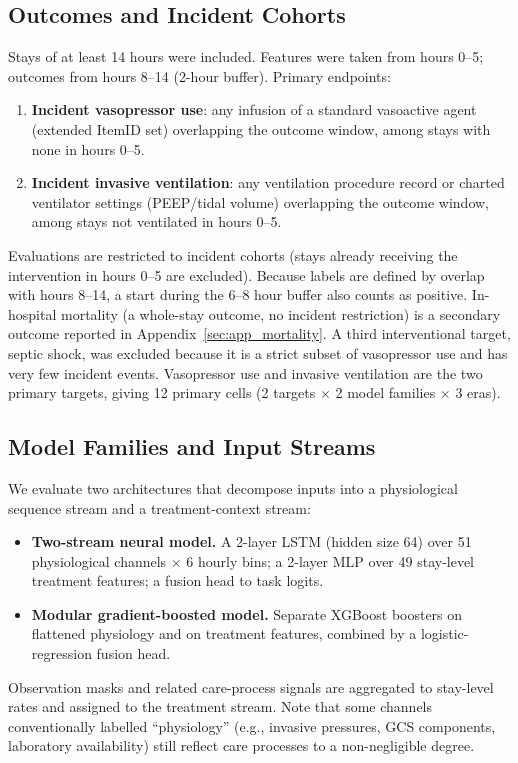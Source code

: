 \documentclass[10pt,a4paper,twocolumn]{article}
\begin{document}
	\subsection{Outcomes and Incident Cohorts}
	\label{sec:outcomes}
	Stays of at least 14 hours were included. Features were taken from hours 0--5; outcomes from hours 8--14 (2-hour buffer). Primary endpoints:
	\begin{enumerate}\setlength{\itemsep}{1pt}
		\item \textbf{Incident vasopressor use}: any infusion of a standard vasoactive agent (extended ItemID set) overlapping the outcome window, among stays with none in hours 0--5.
		\item \textbf{Incident invasive ventilation}: any ventilation procedure record or charted ventilator settings (PEEP/tidal volume) overlapping the outcome window, among stays not ventilated in hours 0--5.
	\end{enumerate}
	Evaluations are restricted to incident cohorts (stays already receiving the intervention in hours 0--5 are excluded). Because labels are defined by overlap with hours 8--14, a start during the 6--8 hour buffer also counts as positive. In-hospital mortality (a whole-stay outcome, no incident restriction) is a secondary outcome reported in Appendix~\ref{sec:app_mortality}. A third interventional target, septic shock, was excluded because it is a strict subset of vasopressor use and has very few incident events. Vasopressor use and invasive ventilation are the two primary targets, giving 12 primary cells (2 targets $\times$ 2 model families $\times$ 3 eras).
	
	\subsection{Model Families and Input Streams}
	We evaluate two architectures that decompose inputs into a physiological sequence stream and a treatment-context stream:
	\begin{itemize}\setlength{\itemsep}{1pt}
		\item \textbf{Two-stream neural model.} A 2-layer LSTM (hidden size 64) over 51 physiological channels $\times$ 6 hourly bins; a 2-layer MLP over 49 stay-level treatment features; a fusion head to task logits.
		\item \textbf{Modular gradient-boosted model.} Separate XGBoost boosters on flattened physiology and on treatment features, combined by a logistic-regression fusion head.
	\end{itemize}
	Observation masks and related care-process signals are aggregated to stay-level rates and assigned to the treatment stream. Note that some channels conventionally labelled ``physiology'' (e.g., invasive pressures, GCS components, laboratory availability) still reflect care processes to a non-negligible degree.
	
\end{document}
